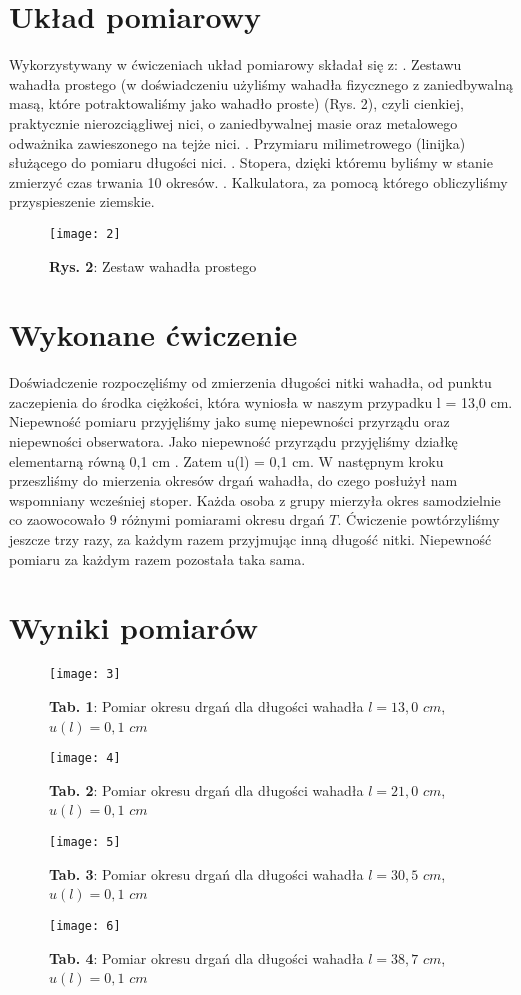 \documentclass[12pt]{article}
\begin{document}
\section{Układ pomiarowy}
Wykorzystywany w ćwiczeniach układ pomiarowy składał się z: . Zestawu wahadła prostego (w doświadczeniu użyliśmy wahadła fizycznego z zaniedbywalną masą, które potraktowaliśmy jako wahadło proste) (Rys. 2), czyli cienkiej, praktycznie nierozciągliwej nici, o zaniedbywalnej masie oraz metalowego odważnika zawieszonego na tejże nici. . Przymiaru milimetrowego (linijka) służącego do pomiaru długości nici. . Stopera, dzięki któremu byliśmy w stanie zmierzyć czas trwania 10 okresów. . Kalkulatora, za pomocą którego obliczyliśmy przyspieszenie ziemskie.  \newline
\begin{figure}[H]
\centering
\texttt{[image: 2]}
\caption*{\textbf{Rys. 2}: Zestaw wahadła prostego}
\end{figure}
\section{Wykonane ćwiczenie}
Doświadczenie rozpoczęliśmy od zmierzenia długości nitki wahadła, od punktu zaczepienia do środka ciężkości, która wyniosła w naszym przypadku l = 13,0 cm. Niepewność pomiaru przyjęliśmy jako sumę niepewności przyrządu oraz niepewności obserwatora. Jako niepewność przyrządu przyjęliśmy działkę elementarną równą 0,1 cm . Zatem u(l) = 0,1 cm. \newline
 W następnym kroku przeszliśmy do mierzenia okresów drgań wahadła, do czego posłużył nam wspomniany wcześniej stoper. Każda osoba z grupy mierzyła okres samodzielnie co zaowocowało 9 różnymi pomiarami okresu drgań $T$. Ćwiczenie powtórzyliśmy jeszcze trzy razy, za każdym razem przyjmując inną długość nitki. Niepewność pomiaru za każdym razem pozostała taka sama.
\section{Wyniki pomiarów}
\begin{figure}[H]
\centering
\texttt{[image: 3]}
\caption*{\textbf{Tab. 1}:	Pomiar okresu drgań dla długości wahadła $l = 13,0$ $cm$, $u(l) = 0,1 $ $cm$ }
\end{figure}
\begin{figure}[H]
\centering
\texttt{[image: 4]}
\caption*{\textbf{Tab. 2}: Pomiar okresu drgań dla długości wahadła $l = 21,0$ $cm$, $u(l) = 0,1 $ $cm$ }
\end{figure}
\begin{figure}[H]
\centering
\texttt{[image: 5]}
\caption*{\textbf{Tab. 3}: Pomiar okresu drgań dla długości wahadła $l = 30,5$ $cm$, $u(l) = 0,1 $ $cm$ }
\end{figure}
\begin{figure}[H]
\centering
\texttt{[image: 6]}
\caption*{\textbf{Tab. 4}: Pomiar okresu drgań dla długości wahadła $l = 38,7$ $cm$, $u(l) = 0,1 $ $cm$ }
\end{figure}
\end{document}
